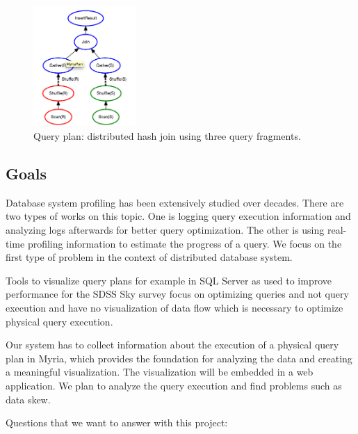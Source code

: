 \documentclass[11pt]{scrartcl}
\begin{document}
\begin{figure}
 \begin{center}
     \includegraphics[width=0.35\textwidth]{partition_join.png}
   \end{center}
  \caption{Query plan: distributed hash join using three query fragments.}
  \label{fig:query_plan}
\end{figure}

\subsection{Goals}
\label{sec:objective}


Database system profiling has been extensively studied over decades. There are two types of works on this topic. One is logging query execution information and analyzing logs afterwards for better query optimization. The other is using real-time profiling information to estimate the progress of a query. We focus on the first type of problem in the context of distributed database system.

Tools to visualize query plans for example in SQL Server as used to improve performance for the SDSS Sky survey\cite{szalay2002sdss} focus on optimizing queries and not query execution and have no visualization of data flow which is necessary to optimize physical query execution.

Our system has to collect information about the execution of a physical query plan in Myria, which provides the foundation for analyzing the data and creating a meaningful visualization. The visualization will be embedded in a web application. We plan to analyze the query execution and find problems such as data skew.

\vspace{5px}

\noindent Questions that we want to answer with this project:
\end{document}
